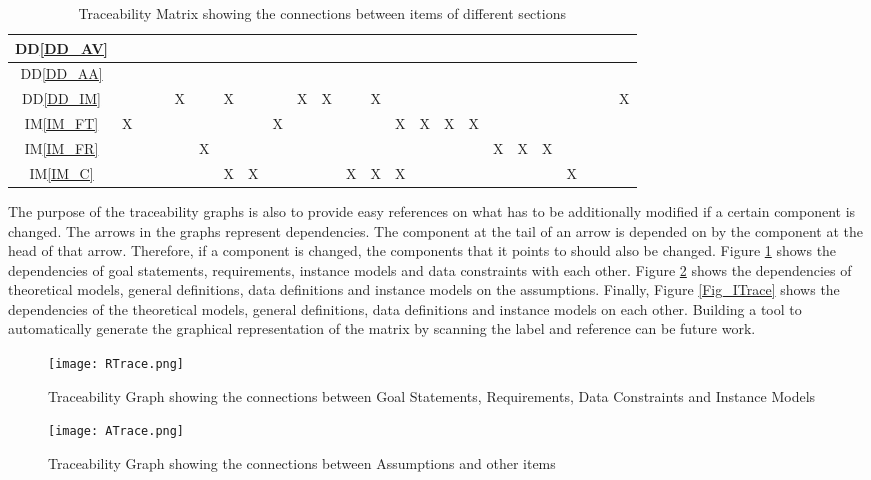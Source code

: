 \documentclass[12pt]{article}
\newcommand{\ddref}[1]{DD\ref{#1}}
\newcommand{\iref}[1]{IM\ref{#1}}
\begin{document}
\begin{landscape}
\begin{table}[h!]
\begin{tabular}{|c|c|c|c|c|c|c|c|c|c|c|c|c|c|c|c|c|c|c|c|c|c|c|c|}
 \ddref{DD_AV} 	& & & & & & & & & & & & & & & & & & & & & & &  \\ \hline
 \ddref{DD_AA} 	& & & & & & & & & & & & & & & & & & & & & & &  \\ \hline
 \ddref{DD_IM} 	& & & &X& &X& & &X&X& &X& & & & & & & & & & &X \\ \hline
 \iref{IM_FT} 	&X& & & & & & &X& & & & &X&X&X&X& & & & & & &  \\ \hline
 \iref{IM_FR} 	& & & & &X& & & & & & & & & & & &X&X&X& & & &  \\ \hline
 \iref{IM_C} 	& & & & & &X&X& & & &X&X&X& & & & & & &X& & &  \\ \hline
\end{tabular}
\bigskip
\caption{Traceability Matrix showing the connections between items of different sections} \label{ITraceMatrix}
\end{table}
\end{landscape}

\noindent
The purpose of the traceability graphs is also to provide easy references on what has to be additionally modified if a certain component is changed. The arrows in the graphs represent dependencies. The component at the tail of an arrow is depended on by the component at the head of that arrow. Therefore, if a component is changed, the components that it points to should also be changed. Figure \ref{Fig_RTrace} shows the dependencies of goal statements, requirements, instance models and data constraints with each other. Figure \ref{Fig_ATrace} shows the dependencies of theoretical models, general definitions, data definitions and instance models on the assumptions. Finally, Figure \ref{Fig_ITrace} shows the dependencies of the theoretical models, general definitions, data definitions and instance models on each other. Building a tool to automatically generate the graphical representation of the matrix by scanning the label and reference can be future work. \\

\begin{figure}[h!]
	\begin{center}
		{
			\texttt{[image: RTrace.png]}
		}
		\bigskip
		\caption{Traceability Graph showing the connections between Goal Statements, Requirements, Data Constraints and Instance Models}
		\label{Fig_RTrace}
	\end{center}
\end{figure}

\begin{figure}[h!]
	\begin{center}
		{
		\texttt{[image: ATrace.png]}
		}
	\bigskip
	\caption{Traceability Graph showing the connections between Assumptions and other items}
	\label{Fig_ATrace}
	\end{center}
\end{figure}
\end{document}
